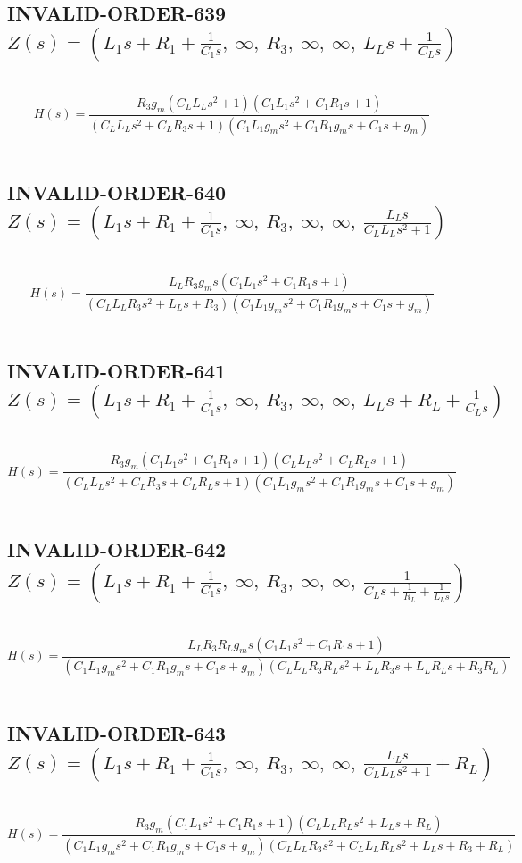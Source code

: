 \documentclass{article}
\begin{document}
\subsection{INVALID-ORDER-639 $Z(s) = \left( L_{1} s + R_{1} + \frac{1}{C_{1} s}, \  \infty, \  R_{3}, \  \infty, \  \infty, \  L_{L} s + \frac{1}{C_{L} s}\right)$ } \ 
\textbf{\[H(s) = \frac{R_{3} g_{m} \left(C_{L} L_{L} s^{2} + 1\right) \left(C_{1} L_{1} s^{2} + C_{1} R_{1} s + 1\right)}{\left(C_{L} L_{L} s^{2} + C_{L} R_{3} s + 1\right) \left(C_{1} L_{1} g_{m} s^{2} + C_{1} R_{1} g_{m} s + C_{1} s + g_{m}\right)}\] } \ 
\subsection{INVALID-ORDER-640 $Z(s) = \left( L_{1} s + R_{1} + \frac{1}{C_{1} s}, \  \infty, \  R_{3}, \  \infty, \  \infty, \  \frac{L_{L} s}{C_{L} L_{L} s^{2} + 1}\right)$ } \ 
\textbf{\[H(s) = \frac{L_{L} R_{3} g_{m} s \left(C_{1} L_{1} s^{2} + C_{1} R_{1} s + 1\right)}{\left(C_{L} L_{L} R_{3} s^{2} + L_{L} s + R_{3}\right) \left(C_{1} L_{1} g_{m} s^{2} + C_{1} R_{1} g_{m} s + C_{1} s + g_{m}\right)}\] } \ 
\subsection{INVALID-ORDER-641 $Z(s) = \left( L_{1} s + R_{1} + \frac{1}{C_{1} s}, \  \infty, \  R_{3}, \  \infty, \  \infty, \  L_{L} s + R_{L} + \frac{1}{C_{L} s}\right)$ } \ 
\textbf{\[H(s) = \frac{R_{3} g_{m} \left(C_{1} L_{1} s^{2} + C_{1} R_{1} s + 1\right) \left(C_{L} L_{L} s^{2} + C_{L} R_{L} s + 1\right)}{\left(C_{L} L_{L} s^{2} + C_{L} R_{3} s + C_{L} R_{L} s + 1\right) \left(C_{1} L_{1} g_{m} s^{2} + C_{1} R_{1} g_{m} s + C_{1} s + g_{m}\right)}\] } \ 
\subsection{INVALID-ORDER-642 $Z(s) = \left( L_{1} s + R_{1} + \frac{1}{C_{1} s}, \  \infty, \  R_{3}, \  \infty, \  \infty, \  \frac{1}{C_{L} s + \frac{1}{R_{L}} + \frac{1}{L_{L} s}}\right)$ } \ 
\textbf{\[H(s) = \frac{L_{L} R_{3} R_{L} g_{m} s \left(C_{1} L_{1} s^{2} + C_{1} R_{1} s + 1\right)}{\left(C_{1} L_{1} g_{m} s^{2} + C_{1} R_{1} g_{m} s + C_{1} s + g_{m}\right) \left(C_{L} L_{L} R_{3} R_{L} s^{2} + L_{L} R_{3} s + L_{L} R_{L} s + R_{3} R_{L}\right)}\] } \ 
\subsection{INVALID-ORDER-643 $Z(s) = \left( L_{1} s + R_{1} + \frac{1}{C_{1} s}, \  \infty, \  R_{3}, \  \infty, \  \infty, \  \frac{L_{L} s}{C_{L} L_{L} s^{2} + 1} + R_{L}\right)$ } \ 
\textbf{\[H(s) = \frac{R_{3} g_{m} \left(C_{1} L_{1} s^{2} + C_{1} R_{1} s + 1\right) \left(C_{L} L_{L} R_{L} s^{2} + L_{L} s + R_{L}\right)}{\left(C_{1} L_{1} g_{m} s^{2} + C_{1} R_{1} g_{m} s + C_{1} s + g_{m}\right) \left(C_{L} L_{L} R_{3} s^{2} + C_{L} L_{L} R_{L} s^{2} + L_{L} s + R_{3} + R_{L}\right)}\] } \ 
\end{document}
